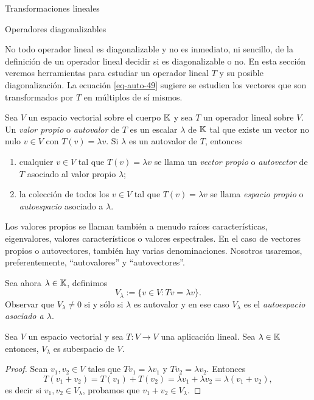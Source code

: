\begin{chapter}{Transformaciones lineales}
\begin{section}{Operadores diagonalizables}
        
        No todo operador lineal es diagonalizable y no es inmediato, ni sencillo, de la definición de un operador lineal decidir si es diagonalizable o no. En esta sección veremos herramientas para estudiar un operador lineal $T$ y su posible diagonalización. La ecuación \eqref{eq-auto-49} sugiere se estudien los vectores que son transformados por $T$ en múltiplos de sí mismos.
        
        \begin{definicion}
            Sea $V$ un espacio vectorial sobre el cuerpo $\mathbb K$ y sea $T$ un operador lineal sobre $V$. Un \textit{valor propio} o \textit{autovalor} de $T$ es un escalar $\lambda$ de $\mathbb K$ tal que existe un vector no nulo $v \in V$ con $T(v) = \lambda v$. Si $\lambda$ es un autovalor de $T$, entonces
            \begin{enumerate}
                \item  cualquier  $v \in V$ tal que $T(v) = \lambda v$  se llama un \textit{vector propio} o  \textit{autovector} de $T$ asociado al valor propio $\lambda$;
                \item la colección de todos los $v \in V$ tal que $T(v) = \lambda v$  se llama \textit{espacio propio} o \textit{autoespacio} 	asociado a $\lambda$. 
            \end{enumerate}
            
            Los valores propios se llaman también a menudo raíces características, eigenvalores, valores característicos o valores espectrales. En  el caso de vectores propios o autovectores, también hay varias denominaciones. Nosotros usaremos, preferentemente, ``autovalores'' y ``autovectores''.
            
            Sea ahora $\lambda \in \mathbb K$, definimos
            $$
            V_\lambda := \{v \in V: Tv = \lambda v \}.
            $$
            Observar que $V_\lambda \ne 0$ si y sólo si $\lambda$ es autovalor y en ese caso $V_\lambda$  es el \textit{autoespacio asociado a $\lambda$}. 
        \end{definicion}
        
        
        \begin{teorema}
            Sea $V$ un espacio vectorial y sea $T:V \to V$ una aplicación lineal. Sea $\lambda \in \mathbb K$ entonces, $V_\lambda$  es subespacio de $V$.
        \end{teorema}
        \begin{proof}
            Sean $v_1,v_2 \in V$ tales que $Tv_1 = \lambda v_1$ y $Tv_2 = \lambda v_2$. Entonces
            $$
            T(v_1+v_2) = T(v_1)+ T(v_2) = \lambda v_1 + \lambda v_2 = \lambda (v_1 + v_2),
            $$
            es decir si  $v_1,v_2 \in V_\lambda$, probamos que $v_1+v_2 \in V_\lambda$. 
            

\end{proof}
\end{section}
\end{chapter}
